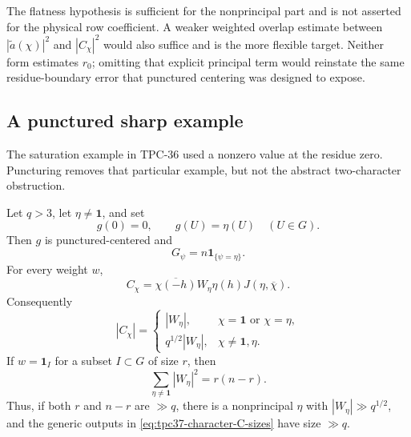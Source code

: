 The flatness hypothesis is sufficient for the nonprincipal part and is
not asserted for the physical row coefficient.  A weaker weighted
overlap estimate between \(|\widetilde a(\chi)|^2\) and
\(|C_\chi|^2\) would also suffice and is the more flexible target.
Neither form estimates \(r_0\); omitting that explicit principal term
would reinstate the same residue-boundary error that punctured centering
was designed to expose.

\subsection{A punctured sharp example}

The saturation example in TPC-36 used a nonzero value at the residue
zero.  Puncturing removes that particular example, but not the abstract
two-character obstruction.

\begin{proposition}
\label{prop:tpc37-punctured-character-witness}
Let \(q>3\), let \(\eta\ne\mathbf1\), and set
\begin{equation}
 g(0)=0,
 \qquad g(U)=\eta(U)\quad(U\in G).
 \label{eq:tpc37-character-g}
\end{equation}
Then \(g\) is punctured-centered and
\begin{equation}
 G_\psi=n\mathbf1_{\{\psi=\eta\}}.
 \label{eq:tpc37-character-transform}
\end{equation}
For every weight \(w\),
\begin{equation}
 \boxed{
 C_\chi
 =\overline{\chi(-h)}W_\eta\eta(h)
 J(\eta,\overline\chi).}
 \label{eq:tpc37-character-C}
\end{equation}
Consequently
\begin{equation}
 |C_\chi|=
 \begin{cases}
 |W_\eta|,&\chi=\mathbf1\text{ or }\chi=\eta,\\
 q^{1/2}|W_\eta|,
   &\chi\ne\mathbf1,\eta.
 \end{cases}
 \label{eq:tpc37-character-C-sizes}
\end{equation}
If \(w=\mathbf1_I\) for a subset \(I\subset G\) of size \(r\), then
\begin{equation}
 \sum_{\eta\ne\mathbf1}|W_\eta|^2=r(n-r).
 \label{eq:tpc37-subset-W-energy}
\end{equation}
Thus, if both \(r\) and \(n-r\) are \(\gg q\), there is a
nonprincipal \(\eta\) with
\(|W_\eta|\gg q^{1/2}\), and the generic outputs in
\eqref{eq:tpc37-character-C-sizes} have size \(\gg q\).
\end{proposition}

